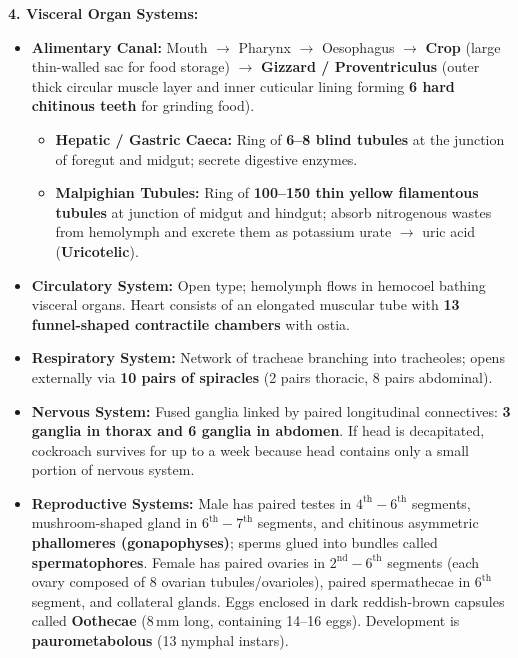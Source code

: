 \documentclass[10pt,twoside,openright]{book}
\begin{document}
\begin{conceptbox}
\textbf{4. Visceral Organ Systems:}
\begin{itemize}
  \item \textbf{Alimentary Canal:} Mouth $\to$ Pharynx $\to$ Oesophagus $\to$ \textbf{Crop} (large thin-walled sac for food storage) $\to$ \textbf{Gizzard / Proventriculus} (outer thick circular muscle layer and inner cuticular lining forming \textbf{6 hard chitinous teeth} for grinding food).
  \begin{itemize}
    \item \textbf{Hepatic / Gastric Caeca:} Ring of \textbf{6--8 blind tubules} at the junction of foregut and midgut; secrete digestive enzymes.
    \item \textbf{Malpighian Tubules:} Ring of \textbf{100--150 thin yellow filamentous tubules} at junction of midgut and hindgut; absorb nitrogenous wastes from hemolymph and excrete them as potassium urate $\to$ uric acid (\textbf{Uricotelic}).
  \end{itemize}
  \item \textbf{Circulatory System:} Open type; hemolymph flows in hemocoel bathing visceral organs. Heart consists of an elongated muscular tube with \textbf{13 funnel-shaped contractile chambers} with ostia.
  \item \textbf{Respiratory System:} Network of tracheae branching into tracheoles; opens externally via \textbf{10 pairs of spiracles} (2 pairs thoracic, 8 pairs abdominal).
  \item \textbf{Nervous System:} Fused ganglia linked by paired longitudinal connectives: \textbf{3 ganglia in thorax and 6 ganglia in abdomen}. If head is decapitated, cockroach survives for up to a week because head contains only a small portion of nervous system.
  \item \textbf{Reproductive Systems:} Male has paired testes in $4^{\mathrm{th}}-6^{\mathrm{th}}$ segments, mushroom-shaped gland in $6^{\mathrm{th}}-7^{\mathrm{th}}$ segments, and chitinous asymmetric \textbf{phallomeres (gonapophyses)}; sperms glued into bundles called \textbf{spermatophores}. Female has paired ovaries in $2^{\mathrm{nd}}-6^{\mathrm{th}}$ segments (each ovary composed of 8 ovarian tubules/ovarioles), paired spermathecae in $6^{\mathrm{th}}$ segment, and collateral glands. Eggs enclosed in dark reddish-brown capsules called \textbf{Oothecae} ($8\,\mathrm{mm}$ long, containing 14--16 eggs). Development is \textbf{paurometabolous} (13 nymphal instars).
\end{itemize}
\end{conceptbox}
\end{document}
